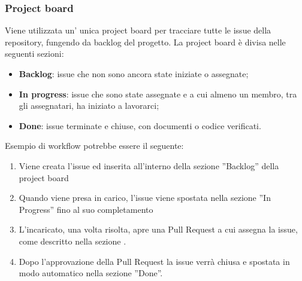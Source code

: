         \subsubsection{Project board}
        Viene utilizzata un' unica project board per tracciare tutte le issue della repository, fungendo da backlog del progetto.
        La project board è divisa nelle seguenti sezioni:
        \begin{itemize}
            \item \textbf{Backlog}: issue che non sono ancora state iniziate o assegnate;
            \item \textbf{In progress}: issue che sono state assegnate e a cui almeno un membro, tra gli assegnatari, ha iniziato a lavorarci;
            \item \textbf{Done}: issue terminate e chiuse, con documenti o codice verificati.
        \end{itemize}
        Esempio di workflow potrebbe essere il seguente:
        \begin{enumerate}
            \item Viene creata l'issue ed inserita all'interno della sezione ”Backlog” della project board
            \item Quando viene presa in carico, l'issue viene spostata nella sezione ”In Progress” fino al suo completamento
            \item L'incaricato, una volta risolta, apre una Pull Request a cui assegna la issue, come descritto nella sezione .
            \item Dopo l'approvazione della Pull Request la issue verrà chiusa e spostata in modo automatico nella sezione ”Done”.
        \end{enumerate}


